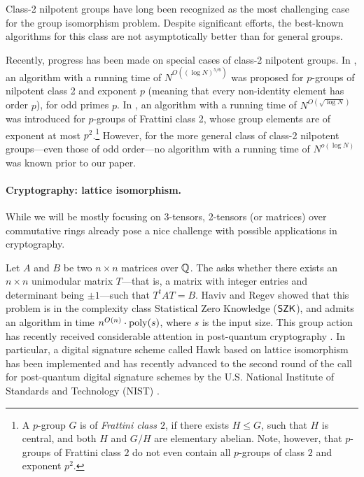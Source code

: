 Class-2 nilpotent groups have long been recognized as the most challenging case for the group isomorphism problem. Despite significant efforts, the best-known algorithms for this class are not asymptotically better than for general groups. %




Recently, progress has been made on special cases of class-2 nilpotent groups. In \cite{Sun23}, an algorithm with a running time of $N^{O((\log N)^{5 / 6})}$ was proposed for $p$-groups of nilpotent class 2 and exponent $p$ (meaning that every non-identity element has order $p$), for odd primes $p$. In \cite{IMQSZ24}, an algorithm with a running time of $N^{O(\sqrt{\log N})}$ was introduced for $p$-groups of Frattini class 2,  whose group elements are of exponent at most $p^2$.\footnote{A $p$-group $G$ is of \emph{Frattini class $2$}, if there exists $H\leq G$, such that $H$ is central, and both $H$ and $G/H$ are elementary abelian. 
Note, however, that $p$-groups of Frattini class $2$ do not even contain all $p$-groups of class $2$ and exponent $p^2$.} However, for the more general class of class-2 nilpotent groups---even those of odd order---no algorithm with a running time of $N^{o(\log N)}$ was known prior to our paper.

\paragraph{Cryptography: lattice isomorphism.} While we will be mostly focusing on 3-tensors, 2-tensors (or matrices) over commutative rings already pose a nice challenge with possible applications in cryptography. 

Let $A$ and $B$ be two $n\times n$ matrices over $\mathbb{Q}$. The  asks whether there exists an $n\times n$ unimodular matrix $T$---that is, a matrix with integer entries and determinant being $\pm 1$---such that $T^tAT=B$. Haviv and Regev \cite{HR14} showed that this problem is in the complexity class Statistical Zero Knowledge ($\mathsf{SZK}$), and admits an algorithm in time $n^{O(n)}\cdot \mathrm{poly}(s)$, where $s$ is the input size. This group action has recently received considerable attention in post-quantum cryptography \cite{DW22,DG23,BBCK24}. In particular, a digital signature scheme called Hawk \cite{Hawk} based on lattice isomorphism has been implemented 
and has recently advanced to the second round of the call for post-quantum digital signature schemes by the U.S. National Institute of Standards and Technology (NIST) \cite{NIST-report}.


